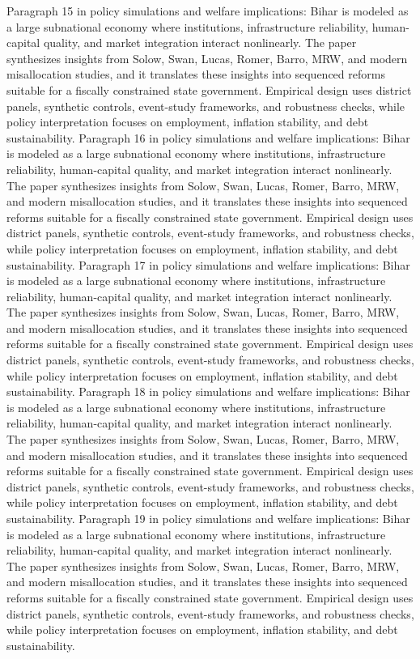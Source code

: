 \documentclass[preprint,12pt]{elsarticle}
\begin{document}
Paragraph 15 in policy simulations and welfare implications: Bihar is modeled as a large subnational economy where institutions, infrastructure reliability, human-capital quality, and market integration interact nonlinearly. The paper synthesizes insights from Solow, Swan, Lucas, Romer, Barro, MRW, and modern misallocation studies, and it translates these insights into sequenced reforms suitable for a fiscally constrained state government. Empirical design uses district panels, synthetic controls, event-study frameworks, and robustness checks, while policy interpretation focuses on employment, inflation stability, and debt sustainability.
Paragraph 16 in policy simulations and welfare implications: Bihar is modeled as a large subnational economy where institutions, infrastructure reliability, human-capital quality, and market integration interact nonlinearly. The paper synthesizes insights from Solow, Swan, Lucas, Romer, Barro, MRW, and modern misallocation studies, and it translates these insights into sequenced reforms suitable for a fiscally constrained state government. Empirical design uses district panels, synthetic controls, event-study frameworks, and robustness checks, while policy interpretation focuses on employment, inflation stability, and debt sustainability.
Paragraph 17 in policy simulations and welfare implications: Bihar is modeled as a large subnational economy where institutions, infrastructure reliability, human-capital quality, and market integration interact nonlinearly. The paper synthesizes insights from Solow, Swan, Lucas, Romer, Barro, MRW, and modern misallocation studies, and it translates these insights into sequenced reforms suitable for a fiscally constrained state government. Empirical design uses district panels, synthetic controls, event-study frameworks, and robustness checks, while policy interpretation focuses on employment, inflation stability, and debt sustainability.
Paragraph 18 in policy simulations and welfare implications: Bihar is modeled as a large subnational economy where institutions, infrastructure reliability, human-capital quality, and market integration interact nonlinearly. The paper synthesizes insights from Solow, Swan, Lucas, Romer, Barro, MRW, and modern misallocation studies, and it translates these insights into sequenced reforms suitable for a fiscally constrained state government. Empirical design uses district panels, synthetic controls, event-study frameworks, and robustness checks, while policy interpretation focuses on employment, inflation stability, and debt sustainability.
Paragraph 19 in policy simulations and welfare implications: Bihar is modeled as a large subnational economy where institutions, infrastructure reliability, human-capital quality, and market integration interact nonlinearly. The paper synthesizes insights from Solow, Swan, Lucas, Romer, Barro, MRW, and modern misallocation studies, and it translates these insights into sequenced reforms suitable for a fiscally constrained state government. Empirical design uses district panels, synthetic controls, event-study frameworks, and robustness checks, while policy interpretation focuses on employment, inflation stability, and debt sustainability.
\end{document}

